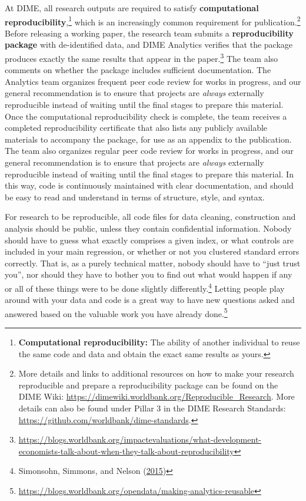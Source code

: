 \documentclass[
]{book}
\begin{document}
At DIME, all research outputs are required to satisfy \textbf{computational reproducibility},\footnote{\textbf{Computational reproducibility:} The ability of another individual
  to reuse the same code and data and obtain the exact same results as yours.}
which is an increasingly common requirement for publication.\footnote{More details and links to additional resources on
  how to make your research reproducible and prepare a reproducibility package
  can be found on the DIME Wiki:
  \url{https://dimewiki.worldbank.org/Reproducible_Research}.
  More details can also be found under Pillar 3 in the DIME Research Standards:
  \url{https://github.com/worldbank/dime-standards}.}
Before releasing a working paper,
the research team submits a \textbf{reproducibility package} with de-identified data,
and DIME Analytics verifies that the package produces
exactly the same results that appear in the paper.\footnote{\url{https://blogs.worldbank.org/impactevaluations/what-development-economists-talk-about-when-they-talk-about-reproducibility}}
The team also comments on whether the package includes sufficient documentation.
The Analytics team organizes frequent peer code review for works in progress,
and our general recommendation is to ensure that projects
are \emph{always} externally reproducible
instead of waiting until the final stages to prepare this material.
Once the computational reproducibility check is complete,
the team receives a completed reproducibility certificate
that also lists any publicly available materials to accompany the package,
for use as an appendix to the publication.
The team also organizes regular peer code review for works in progress,
and our general recommendation is to ensure that projects
are \emph{always} externally reproducible
instead of waiting until the final stages to prepare this material.
In this way, code is continuously maintained with clear documentation,
and should be easy to read and understand in terms of structure, style, and syntax.

For research to be reproducible,
all code files for data cleaning, construction and analysis
should be public, unless they contain confidential information.
Nobody should have to guess what exactly comprises a given index,
or what controls are included in your main regression,
or whether or not you clustered standard errors correctly.
That is, as a purely technical matter, nobody should have to ``just trust you'',
nor should they have to bother you to find out what would happen
if any or all of these things were to be done slightly differently.\footnote{Simonsohn, Simmons, and Nelson (\protect\hyperlink{ref-simonsohn2015specification}{2015})}
Letting people play around with your data and code
is a great way to have new questions asked and answered
based on the valuable work you have already done.\footnote{\url{https://blogs.worldbank.org/opendata/making-analytics-reusable}}
\end{document}
